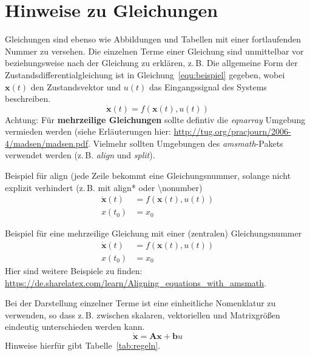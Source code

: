 \section{Hinweise zu Gleichungen}
\label{hinweise:gleichungen}
%
Gleichungen sind ebenso wie Abbildungen und Tabellen mit einer
fortlaufenden Nummer zu versehen. Die einzelnen Terme einer
Gleichung sind unmittelbar vor beziehungsweise nach der Gleichung
zu erklären, z.\,B. \glqq Die allgemeine Form der
Zustandsdifferentialgleichung ist in Gleichung~\ref{equ:beispiel} gegeben,
wobei $\mathbf{x}(t)$ den Zustandsvektor und $u(t)$ das
Eingangssignal des Systems beschreiben.\grqq
%
\begin{equation}
  \dot{\mathbf{x}}(t) = f(\mathbf{x}(t), u(t))
  \label{equ:beispiel}
\end{equation}
%
Achtung: Für \textbf{mehrzeilige Gleichungen} sollte defintiv die \textit{eqnarray} Umgebung
vermieden werden (siehe Erläuterungen hier: \url{http://tug.org/pracjourn/2006-4/madsen/madsen.pdf}.
Vielmehr sollten Umgebungen des \textit{amsmath}-Pakets verwendet werden (z.\,B. \textit{align} und \textit{split}).

Beispiel für align (jede Zeile bekommt eine Gleichungsnummer, solange nicht explizit verhindert (z.\,B. mit align* oder \textbackslash nonumber)
\begin{align}
    \dot{\mathbf{x}}(t) &= f(\mathbf{x}(t), u(t)) \\
    x(t_0) &= x_0
\end{align}

Beispiel für eine mehrzeilige Gleichung mit einer (zentralen) Gleichungsnummer
\begin{equation}
\begin{split}
    \dot{\mathbf{x}}(t) &= f(\mathbf{x}(t), u(t)) \\
    x(t_0) &= x_0
\end{split}
\end{equation}
Hier sind weitere Beispiele zu finden: \sloppy\url{https://de.sharelatex.com/learn/Aligning_equations_with_amsmath}.


%
Bei der Darstellung einzelner Terme ist eine einheitliche
Nomenklatur zu verwenden, so dass z.\,B. zwischen skalaren,
vektoriellen und Matrixgrößen eindeutig unterschieden werden kann.
%
\begin{equation}
  \dot{\mathbf{x}} = \mathbf{A} \mathbf{x} + \mathbf{b} u
  \label{equ:beispiel2}
\end{equation}
%
Hinweise hierfür gibt Tabelle~\ref{tab:regeln}.

